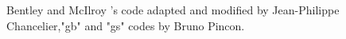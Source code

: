 \begin{manseealso}
\end{manseealso}

\begin{authors}
Bentley and McIlroy 's code adapted and modified by Jean-Philippe Chancelier,"gb"
and "gs" codes by Bruno Pincon.
\end{authors}
